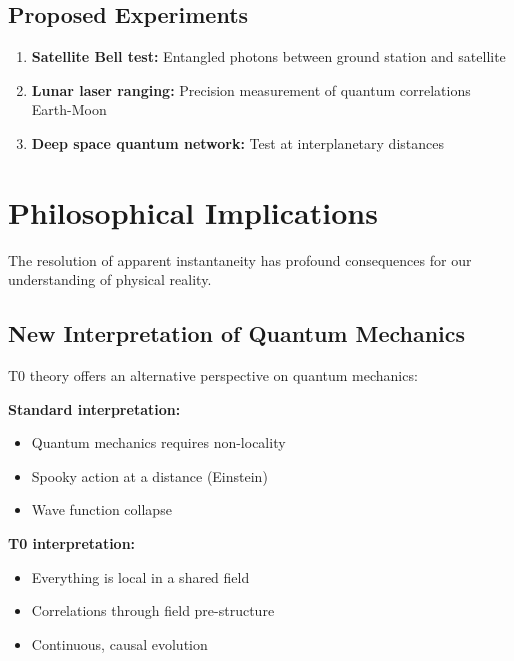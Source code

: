 	\subsection{Proposed Experiments}
	
	\begin{enumerate}
		\item \textbf{Satellite Bell test:} Entangled photons between ground station and satellite
		\item \textbf{Lunar laser ranging:} Precision measurement of quantum correlations Earth-Moon
		\item \textbf{Deep space quantum network:} Test at interplanetary distances
	\end{enumerate}
	
	\section{Philosophical Implications}
	
	The resolution of apparent instantaneity has profound consequences for our understanding of physical reality.
	
	\subsection{New Interpretation of Quantum Mechanics}
	
	T0 theory offers an alternative perspective on quantum mechanics:
	
	\begin{tcolorbox}[colback=t0red!5!white, colframe=t0red!75!black, title=New Perspective]
		\textbf{Standard interpretation:}
		\begin{itemize}
			\item Quantum mechanics requires non-locality
			\item Spooky action at a distance (Einstein)
			\item Wave function collapse
		\end{itemize}
		
		\textbf{T0 interpretation:}
		\begin{itemize}
			\item Everything is local in a shared field
			\item Correlations through field pre-structure
			\item Continuous, causal evolution
		\end{itemize}
	\end{tcolorbox}
	
